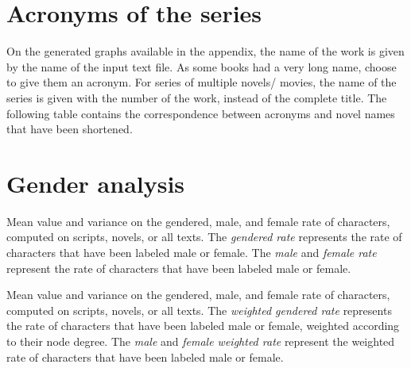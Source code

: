 \documentclass[a4paper, 12pt]{report}
\begin{document}
\begin{appendices}

\chapter{Acronyms of the series}
\label{acronyms}
On the generated graphs available in the appendix, the name of the work is given by the name of the input text file. As some books had a very long name, \cite{original} choose to give them an acronym. For series of multiple novels/ movies, the name of the series is given with the number of the work, instead of the complete title. The following table contains the correspondence between acronyms and novel names that have been shortened. \\


\begin{table}
\center
{}
\caption{Acronyms of novels series.}
\label{acronyms_table}
\end{table}




\chapter{Gender analysis}
\label{gender_table}
\begin{table}[]
\caption{Mean value and variance on the gendered, male, and female rate of characters, computed on scripts, novels, or all texts. The \textit{gendered rate} represents the rate of characters that have been labeled male or female. The \textit{male} and \textit{female rate} represent the rate of characters that have been labeled male or female. }
\label{gender_all}
\end{table}

\begin{table}[]
\caption{Mean value and variance on the gendered, male, and female rate of characters, computed on scripts, novels, or all texts. The \textit{weighted gendered rate} represents the rate of characters that have been labeled male or female, weighted according to their node degree. The \textit{male} and \textit{female weighted rate} represent the weighted rate of characters that have been labeled male or female. }
\label{gender_all_weighted}
\end{table}



\end{appendices}
\end{document}
